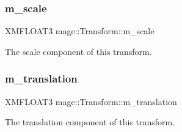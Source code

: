 \subsubsection{\texorpdfstring{m\+\_\+scale}{m\_scale}}
{\footnotesize\ttfamily X\+M\+F\+L\+O\+A\+T3 mage\+::\+Transform\+::m\+\_\+scale\hspace{0.3cm}{\ttfamily [private]}}

The scale component of this transform. \hypertarget{structmage_1_1_transform_a57e27b28e0cf85be034055a68513ad79}{}\label{structmage_1_1_transform_a57e27b28e0cf85be034055a68513ad79} 
\subsubsection{\texorpdfstring{m\+\_\+translation}{m\_translation}}
{\footnotesize\ttfamily X\+M\+F\+L\+O\+A\+T3 mage\+::\+Transform\+::m\+\_\+translation\hspace{0.3cm}{\ttfamily [private]}}

The translation component of this transform. 